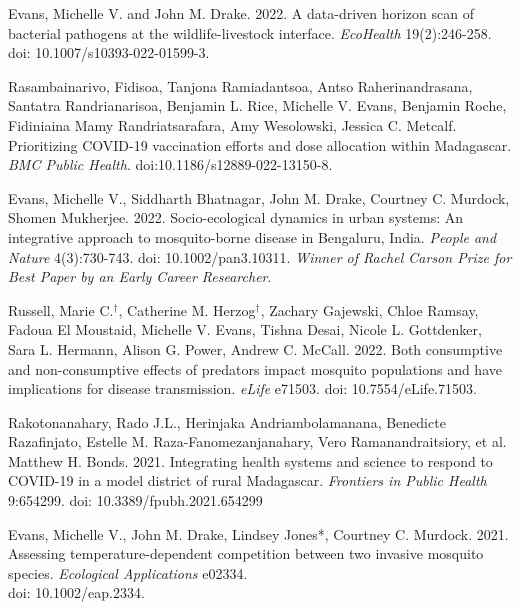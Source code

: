 \begin{etaremune}
\item \textcolor{awesome}{Evans, Michelle V.} and John M. Drake. 2022. A data-driven horizon scan of bacterial pathogens at the wildlife-livestock interface. \textit{EcoHealth} 19(2):246-258. doi: 10.1007/s10393-022-01599-3. \smallskip

\item Rasambainarivo, Fidisoa, Tanjona Ramiadantsoa, Antso Raherinandrasana, Santatra Randrianarisoa, Benjamin L. Rice, \textcolor{awesome}{Michelle V. Evans}, Benjamin Roche, Fidiniaina Mamy Randriatsarafara, Amy Wesolowski, Jessica C. Metcalf. Prioritizing COVID-19 vaccination efforts and dose allocation within Madagascar. \textit{BMC Public Health}. doi:10.1186/s12889-022-13150-8. \smallskip

\item \textcolor{awesome}{Evans, Michelle V.}, Siddharth Bhatnagar, John M. Drake, Courtney C. Murdock, Shomen Mukherjee. 2022. Socio-ecological dynamics in urban systems: An integrative approach to mosquito-borne disease in Bengaluru, India. \textit{People and Nature} 4(3):730-743. doi: 10.1002/pan3.10311. \textit{Winner of Rachel Carson Prize for Best Paper by an Early Career Researcher}. \smallskip

\item Russell, Marie C.$^\dagger$, Catherine M. Herzog$^\dagger$, Zachary Gajewski, Chloe Ramsay, Fadoua El Moustaid, \textcolor{awesome}{Michelle V. Evans}, Tishna Desai, Nicole L. Gottdenker, Sara L. Hermann, Alison G. Power, Andrew C. McCall. 2022. Both consumptive and non-consumptive effects of predators impact mosquito populations and have implications for disease transmission. \textit{eLife} e71503. doi: 10.7554/eLife.71503. \smallskip

\item Rakotonanahary, Rado J.L., Herinjaka Andriambolamanana, Benedicte Razafinjato, Estelle M. Raza-Fanomezanjanahary, Vero Ramanandraitsiory, et al. Matthew H. Bonds. 2021. Integrating health systems and science to respond to COVID-19 in a model district of rural Madagascar. \textit{Frontiers in Public Health} 9:654299. doi: 10.3389/fpubh.2021.654299 \smallskip

\item \textcolor{awesome}{Evans, Michelle V.}, John M. Drake, Lindsey Jones*, Courtney C. Murdock. 2021. Assessing temperature-dependent competition between two invasive mosquito species. \textit{Ecological Applications} e02334. \\ doi: 10.1002/eap.2334. \smallskip


\end{etaremune}
